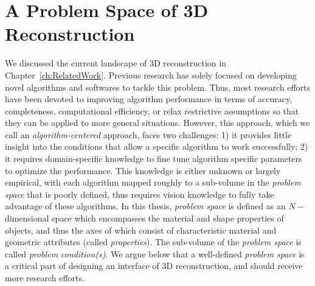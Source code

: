 
\chapter{A Problem Space of 3D Reconstruction}
\label{ch:3DRecon_ProbSpace}
We discussed the current landscape of 3D reconstruction in Chapter~\ref{ch:RelatedWork}. Previous research has solely focused on developing novel algorithms and softwares to tackle this problem. Thus, most research efforts have been devoted to improving algorithm performance in terms of accuracy, completeness, computational efficiency, or relax restrictive assumptions so that they can be applied to more general situations. However, this approach, which we call an \textit{algorithm-centered} approach, faces two challenges: 1) it provides little insight into the conditions that allow a specific algorithm to work successfully; 2) it requires domain-specific knowledge to fine tune algorithm specific parameters to optimize the performance. This knowledge is either unknown or largely empirical, with each algorithm mapped roughly to a sub-volume in the \textit{problem space} that is poorly defined, thus requires vision knowledge to fully take advantage of these algorithms. In this thesis, \textit{problem space} is defined as an $N-$dimensional space which encompasses the material and shape properties of objects, and thus the axes of which consist of characteristic material and geometric attributes (called \textit{properties}). The sub-volume of the \textit{problem space} is called \textit{problem condition(s)}. We argue below that a well-defined \textit{problem space} is a critical part of designing an interface of 3D reconstruction, and should receive more research efforts.


